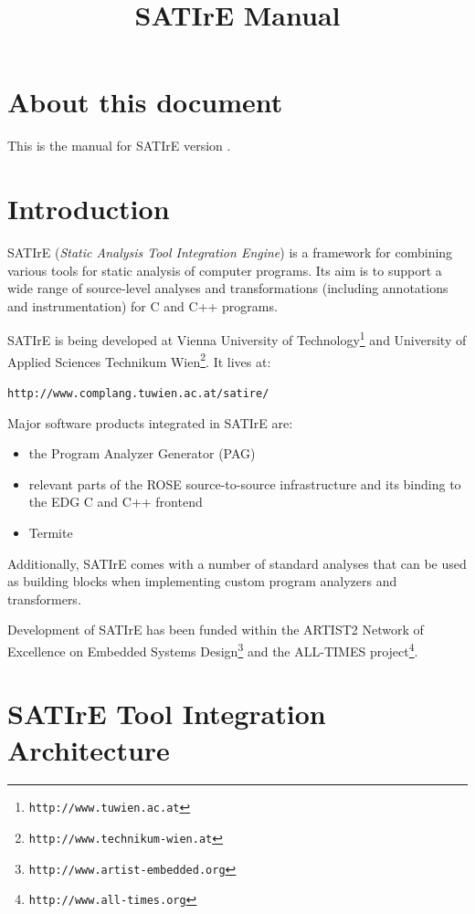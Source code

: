 \documentclass[a4paper,12pt]{report}
\title{SATIrE Manual}
\author{}
\begin{document}
\maketitle

\chapter*{About this document}

This is the manual for SATIrE version \version.

\tableofcontents

\chapter{Introduction}
\label{chap:introduction}

SATIrE (\emph{Static Analysis Tool Integration Engine}) is a framework for
combining various tools for static analysis of computer programs. Its aim is
to support a wide range of source-level analyses and transformations
(including annotations and instrumentation) for C and C++ programs.

SATIrE is being developed at Vienna University of
Technology\footnote{\texttt{http://www.tuwien.ac.at}} and University of
Applied Sciences Technikum
Wien\footnote{\texttt{http://www.technikum-wien.at}}. It lives at:
\begin{center}
\verb|http://www.complang.tuwien.ac.at/satire/|
\end{center}

Major software products integrated in SATIrE are:
\begin{itemize}
\item the Program Analyzer Generator (PAG)
\item relevant parts of the ROSE source-to-source infrastructure and its
binding to the EDG C and C++ frontend
\item Termite
\end{itemize}

Additionally, SATIrE comes with a number of standard analyses that can be
used as building blocks when implementing custom program analyzers and
transformers.

Development of SATIrE has been funded within the ARTIST2 Network of
Excellence on Embedded Systems
Design\footnote{\texttt{http://www.artist-embedded.org}} and the ALL-TIMES
project\footnote{\texttt{http://www.all-times.org}}.

\chapter{SATIrE Tool Integration Architecture}
\end{document}
